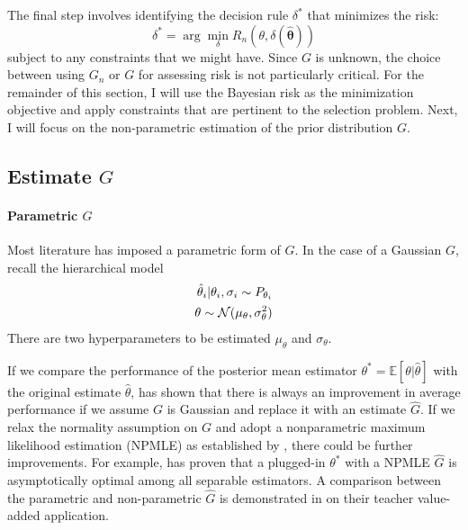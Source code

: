 \documentclass[12pt]{article}
\begin{document}
The final step involves identifying the decision rule \( \delta^* \) that
minimizes the risk:
\begin{equation}
    \delta^* = \arg \min_{\delta} R_n(\theta, \delta(\boldsymbol{\hat{\theta}}))
\end{equation}
subject to any constraints that we might have. Since \( G \) is unknown, the choice between using \( G_n \) or \( G \) for assessing risk is not particularly critical. For the remainder of this section, I will use the Bayesian risk as the minimization objective and apply constraints that are pertinent to the selection problem. Next, I will focus on the non-parametric estimation of the prior distribution \( G \).

\subsection{Estimate $G$}

\paragraph{Parametric $G$}

Most literature has imposed a parametric form of $G$. In the case of a Gaussian
$G$, recall the hierarchical model
\begin{align*}
    \hat{\theta}_i|\theta_i, \sigma_i \sim P_{\theta_i} \\
    \theta\sim \mathcal{N}(\mu_\theta,\sigma^2_\theta)
\end{align*}
There are two hyperparameters to be estimated $\mu_\theta$ and $\sigma_\theta$.

If we compare the performance of the posterior mean estimator \( \theta^* =
\mathbb{E}[\theta | \hat{\theta}] \) with the original estimate \( \hat{\theta}
\), \citet{james1992estimation} has shown that there is always an improvement
in average performance if we assume \( G \) is Gaussian and replace it with an
estimate \( \hat{G} \). If we relax the normality assumption on \( G \) and
adopt a nonparametric maximum likelihood estimation (NPMLE) as established by
\citet{kiefer1956consistency}, there could be further improvements. For
example, \citet{jiang2009general} has proven that a plugged-in \( \theta^* \)
with a NPMLE \( \hat{G} \) is asymptotically optimal among all separable
estimators. A comparison between the parametric and non-parametric \( \hat{G}
\) is demonstrated in \citet{gilraine2020new} on their teacher value-added
application.
\end{document}
